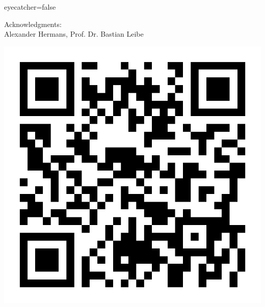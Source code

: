 \documentclass[portrait,final,a0paper,fontscale=0.28]{baposter}
\begin{document}
\begin{poster}{eyecatcher=false}
{\begin{minipage}{0.825\textwidth}
            Acknowledgments:\\Alexander Hermans, Prof. Dr. Bastian Leibe
            \vfill
        \end{minipage}
        \begin{minipage}{0.15\textwidth}
            \includegraphics[scale=0.15]{qrcode}
        \end{minipage}
    }
	
\end{poster}
\end{document}
